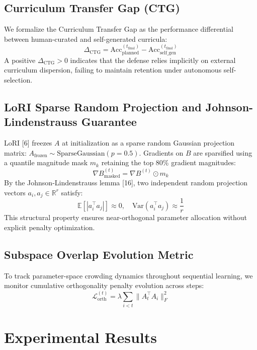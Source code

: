 \documentclass[10pt,journal,compsoc]{IEEEtran}
\begin{document}
\subsection{Curriculum Transfer Gap (CTG)}
We formalize the Curriculum Transfer Gap as the performance differential between human-curated and self-generated curricula:
\begin{equation}
\Delta_{\text{CTG}} = \text{Acc}_{\text{planned}}^{(t_{\text{final}})} - \text{Acc}_{\text{self\_gen}}^{(t_{\text{final}})}
\end{equation}
A positive $\Delta_{\text{CTG}} > 0$ indicates that the defense relies implicitly on external curriculum dispersion, failing to maintain retention under autonomous self-selection.

\subsection{LoRI Sparse Random Projection and Johnson-Lindenstrauss Guarantee}
LoRI [6] freezes $A$ at initialization as a sparse random Gaussian projection matrix: $A_{\text{frozen}} \sim \text{SparseGaussian}(p=0.5)$. Gradients on $B$ are sparsified using a quantile magnitude mask $m_k$ retaining the top 80\% gradient magnitudes:
\begin{equation}
\nabla B_{\text{masked}}^{(t)} = \nabla B^{(t)} \odot m_k
\end{equation}
By the Johnson-Lindenstrauss lemma [16], two independent random projection vectors $a_i, a_j \in \mathbb{R}^r$ satisfy:
\begin{equation}
\mathbb{E}[|a_i^\top a_j|] \approx 0, \quad \text{Var}(a_i^\top a_j) \approx \frac{1}{r}
\end{equation}
This structural property ensures near-orthogonal parameter allocation without explicit penalty optimization.

\subsection{Subspace Overlap Evolution Metric}
To track parameter-space crowding dynamics throughout sequential learning, we monitor cumulative orthogonality penalty evolution across steps:
\begin{equation}
\mathcal{L}_{\text{orth}}^{(t)} = \lambda \sum_{i < t} \|A_t^\top A_i\|_F^2
\end{equation}

\section{Experimental Results}
\end{document}
